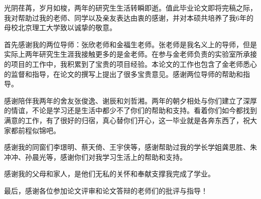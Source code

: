 
\begin{thanks}

光阴荏苒，岁月如梭，两年的研究生生活转瞬即逝。值此毕业论文即将完稿之际，我对帮助过我的老师、同学以及亲友表达由衷的感谢，并对本硕共培养了我6年的母校北京理工大学致以诚挚的敬意。

首先感谢我的两位导师：张欣老师和金福生老师。张老师是我名义上的导师，但是实际上两年研究生生涯我接触更多的是金老师。在参与金老师负责的实验室所承接的项目的工作中，我积累到了宝贵的项目经验。本论文的工作也包含了金老师悉心的监督和指导，在论文的撰写上提出了很多宝贵意见。感谢两位导师的帮助和指导。

感谢陪伴我两年的舍友张俊逸、谢辰和刘哲湘。两年的朝夕相处与你们建立了深厚的情谊，不论是学习还是生活中都少不了你们的帮助和支持。看着你们如今都找到满意的工作，有了很好的归宿，真心替你们开心，这一毕业就是各奔东西了，祝大家都前程似锦吧。

感谢我的同窗们李璟明、蔡天倚、王宇侠等，感谢帮助过我的学长学姐龚思胜、朱冲冲、孙晨光等，感谢你们对我学习生活上的帮助和支持。


感谢我的父母和家人，是他们无私的关怀和奉献支撑我完成了学业。

最后，感谢各位参加论文评审和论文答辩的老师们的批评与指导！
\end{thanks}
